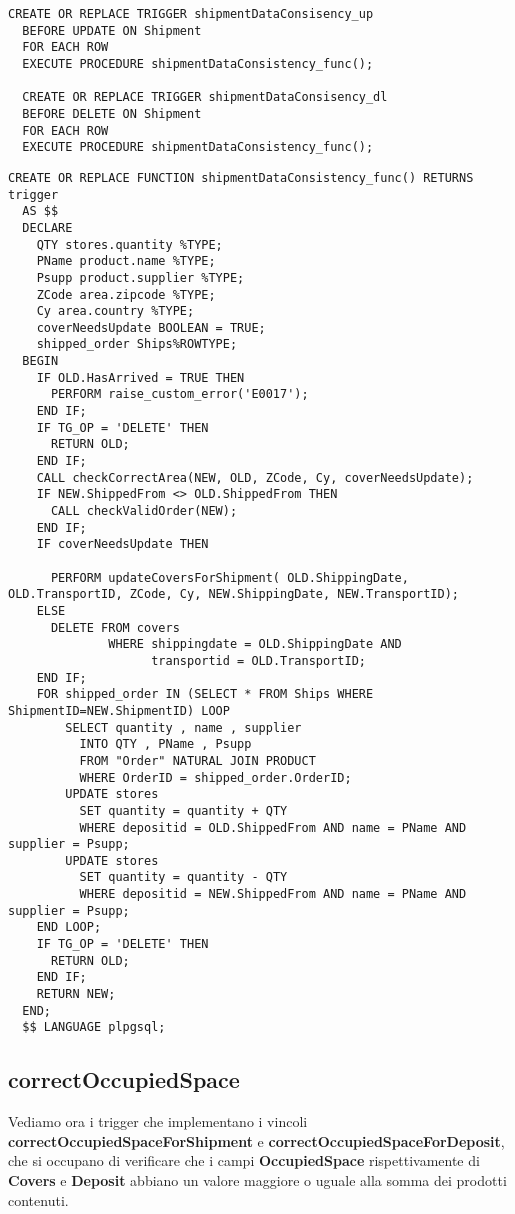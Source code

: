 \begin{lstlisting}[caption={Trigger per \textbf{UPDATE/DELETE ON Shipment}}]
  CREATE OR REPLACE TRIGGER shipmentDataConsisency_up
  BEFORE UPDATE ON Shipment
  FOR EACH ROW
  EXECUTE PROCEDURE shipmentDataConsistency_func();

  CREATE OR REPLACE TRIGGER shipmentDataConsisency_dl
  BEFORE DELETE ON Shipment
  FOR EACH ROW
  EXECUTE PROCEDURE shipmentDataConsistency_func();
\end{lstlisting}
\newpage
\begin{lstlisting}[caption={Funzione completa}]
  CREATE OR REPLACE FUNCTION shipmentDataConsistency_func() RETURNS trigger
  AS $$
  DECLARE
    QTY stores.quantity %TYPE;
    PName product.name %TYPE;
    Psupp product.supplier %TYPE;
    ZCode area.zipcode %TYPE;
    Cy area.country %TYPE;
    coverNeedsUpdate BOOLEAN = TRUE;
    shipped_order Ships%ROWTYPE;
  BEGIN
    IF OLD.HasArrived = TRUE THEN
      PERFORM raise_custom_error('E0017');
    END IF;
    IF TG_OP = 'DELETE' THEN
      RETURN OLD;
    END IF;
    CALL checkCorrectArea(NEW, OLD, ZCode, Cy, coverNeedsUpdate);
    IF NEW.ShippedFrom <> OLD.ShippedFrom THEN
      CALL checkValidOrder(NEW);
    END IF;
    IF coverNeedsUpdate THEN

      PERFORM updateCoversForShipment( OLD.ShippingDate, OLD.TransportID, ZCode, Cy, NEW.ShippingDate, NEW.TransportID);
    ELSE 
      DELETE FROM covers 
              WHERE shippingdate = OLD.ShippingDate AND 
                    transportid = OLD.TransportID;
    END IF;
    FOR shipped_order IN (SELECT * FROM Ships WHERE ShipmentID=NEW.ShipmentID) LOOP
        SELECT quantity , name , supplier 
          INTO QTY , PName , Psupp
          FROM "Order" NATURAL JOIN PRODUCT
          WHERE OrderID = shipped_order.OrderID;
        UPDATE stores
          SET quantity = quantity + QTY
          WHERE depositid = OLD.ShippedFrom AND name = PName AND supplier = Psupp;
        UPDATE stores
          SET quantity = quantity - QTY
          WHERE depositid = NEW.ShippedFrom AND name = PName AND supplier = Psupp;
    END LOOP;
    IF TG_OP = 'DELETE' THEN
      RETURN OLD;
    END IF;
    RETURN NEW;
  END;
  $$ LANGUAGE plpgsql;
\end{lstlisting}

\subsection{\textbf{correctOccupiedSpace}}

Vediamo ora i trigger che implementano i vincoli \textbf{correctOccupiedSpaceForShipment} e \textbf{correctOccupiedSpaceForDeposit}, che si occupano di verificare che i campi \textbf{OccupiedSpace} rispettivamente di \textbf{Covers} e \textbf{Deposit} abbiano un valore maggiore o uguale alla somma dei prodotti contenuti.

